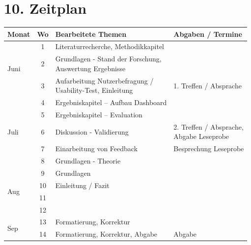 \section*{10. Zeitplan}
\begin{table}[!h]
\begin{tabular}{|l|c|l|l|}
\hline
Monat                 & Wo & Bearbeitete Themen & Abgaben / Termine \\ \hline
\multirow{3}{*}{Juni} & 1  & Literaturrecherche, Methodikkapitel  &                   \\ \cline{2-4} 
                      & 2  & \makecell[l]{Grundlagen - Stand der Forschung,\\ Auswertung Ergebnisse} &                   \\ \cline{2-4} 
                      & 3  & \makecell[l]{Aufarbeitung Nutzerbefragung / \\ Usability-Test, Einleitung} & 1. Treffen / Absprache \\ \hline
\multirow{5}{*}{Juli} & 4  & Ergebniskapitel – Aufbau Dashboard &                   \\ \cline{2-4} 
                      & 5  & Ergebniskapitel – Evaluation &                   \\ \cline{2-4} 
                      & 6  & Diskussion - Validierung & \makecell[l]{2. Treffen / Absprache, \\ Abgabe Leseprobe} \\ \cline{2-4} 
                      & 7  & Einarbeitung von Feedback & Besprechung Leseprobe \\ \cline{2-4} 
                      & 8  & Grundlagen - Theorie &                   \\ \hline
\multirow{4}{*}{Aug}  & 9  & Grundlagen         &                   \\ \cline{2-4} 
                      & 10 & Einleitung / Fazit &                   \\ \cline{2-4} 
                      & 11 &                    &                   \\ \cline{2-4} 
                      & 12 &                    &                   \\ \hline
\multirow{2}{*}{Sep}  & 13 & Formatierung, Korrektur &                   \\ \cline{2-4} 
                      & 14 & Formatierung, Korrektur, Abgabe & Abgabe \\ \hline
\end{tabular}
\end{table}
